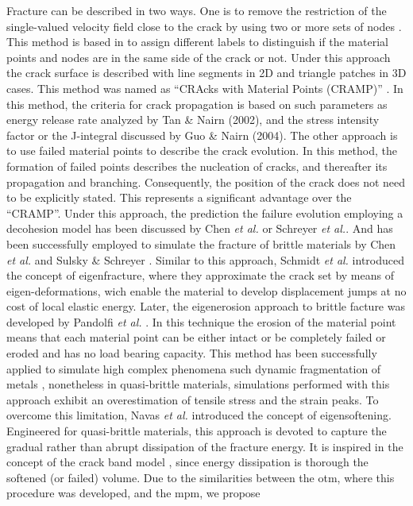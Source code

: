 \documentclass[preprint,12pt,a4paper]{elsarticle}
\begin{document}
Fracture can be described in two ways. One is to remove the
restriction of the single-valued velocity field close to the crack by
using two or more sets of nodes \cite{Nairn_2006}. This method is
based in to assign different labels to distinguish if the material
points and nodes are in the same side of the crack or not. Under this
approach the crack surface is described with line segments in 2D and
triangle patches in 3D cases. This method was named as ``CRAcks with
Material Points (CRAMP)'' \cite{Nairn_2003}. In this method, the
criteria for crack propagation is based on such parameters as energy
release rate analyzed by Tan \& Nairn (2002)\cite{Nairn_2002}, and the
stress intensity factor or the J-integral discussed by Guo \& Nairn 
(2004)\cite{Nairn_2004}. The other approach is to use failed material
points to describe the crack evolution. In this method, the formation
of failed points describes the nucleation of cracks, and thereafter
its propagation and branching. Consequently, the position of the crack
does not need to be explicitly stated. This represents a significant
advantage over the ``CRAMP''. Under this approach, the prediction the
failure evolution employing a decohesion model has been discussed by
Chen {\it et al.}\cite{Zhenmao_2005} or Schreyer {\it et
  al.}\cite{Schreyer_2002}. And has been successfully employed to
simulate the fracture of brittle materials by Chen {\it et al.}
\cite{Chen_2002,Chen_2003} and Sulsky \& Schreyer
\cite{Sulsky_2004}. Similar to this approach, Schmidt {\it et al.}
\cite{Schmidt_2009} introduced the concept of eigenfracture, where
they approximate the crack set by means of eigen-deformations, wich
enable the material to develop displacement jumps at no cost of local
elastic energy. Later, the eigenerosion approach to brittle facture
was developed by Pandolfi {\it et al.}
\cite{Pandolfi_2012,Pandolfi_2013}. In this technique the erosion of
the material point means that each material point can be either intact
or be completely failed or eroded and has no load bearing
capacity. This method has been successfully applied to simulate high
complex phenomena such dynamic fragmentation of metals \cite{Li_2015},
nonetheless in quasi-brittle materials, simulations performed with
this approach exhibit an overestimation of tensile stress and the
strain peaks. To overcome this limitation, Navas {\it et al.}
\cite{Navas_2017_ES,Navas2018a} introduced the concept of
eigensoftening. Engineered for quasi-brittle materials, this approach
is devoted to capture the gradual rather than abrupt dissipation of
the fracture energy. It is inspired in the concept of the crack band
model \cite{Bazant83}, since energy dissipation is thorough the
softened (or failed) volume. Due to the similarities between the \acrshort{otm}, 
where this procedure was developed, and the \acrshort{mpm}, we propose
\end{document}
